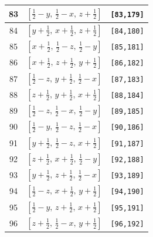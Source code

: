 \documentclass[fleqn,8pt]{jsarticle}
\begin{document}
\begin{longtable}{ccc}
83 & $\left[ \frac{1}{2} - y,\, \frac{1}{2} - x,\, z + \frac{1}{2} \right]$ & {\tt [83,179]} \\ \hline
84 & $\left[ y + \frac{1}{2},\, x + \frac{1}{2},\, z + \frac{1}{2} \right]$ & {\tt [84,180]} \\ \hline
85 & $\left[ x + \frac{1}{2},\, \frac{1}{2} - z,\, \frac{1}{2} - y \right]$ & {\tt [85,181]} \\ \hline
86 & $\left[ x + \frac{1}{2},\, z + \frac{1}{2},\, y + \frac{1}{2} \right]$ & {\tt [86,182]} \\ \hline
87 & $\left[ \frac{1}{2} - z,\, y + \frac{1}{2},\, \frac{1}{2} - x \right]$ & {\tt [87,183]} \\ \hline
88 & $\left[ z + \frac{1}{2},\, y + \frac{1}{2},\, x + \frac{1}{2} \right]$ & {\tt [88,184]} \\ \hline
89 & $\left[ \frac{1}{2} - z,\, \frac{1}{2} - x,\, \frac{1}{2} - y \right]$ & {\tt [89,185]} \\ \hline
90 & $\left[ \frac{1}{2} - y,\, \frac{1}{2} - z,\, \frac{1}{2} - x \right]$ & {\tt [90,186]} \\ \hline
91 & $\left[ y + \frac{1}{2},\, \frac{1}{2} - z,\, x + \frac{1}{2} \right]$ & {\tt [91,187]} \\ \hline
92 & $\left[ z + \frac{1}{2},\, x + \frac{1}{2},\, \frac{1}{2} - y \right]$ & {\tt [92,188]} \\ \hline
93 & $\left[ y + \frac{1}{2},\, z + \frac{1}{2},\, \frac{1}{2} - x \right]$ & {\tt [93,189]} \\ \hline
94 & $\left[ \frac{1}{2} - z,\, x + \frac{1}{2},\, y + \frac{1}{2} \right]$ & {\tt [94,190]} \\ \hline
95 & $\left[ \frac{1}{2} - y,\, z + \frac{1}{2},\, x + \frac{1}{2} \right]$ & {\tt [95,191]} \\ \hline
96 & $\left[ z + \frac{1}{2},\, \frac{1}{2} - x,\, y + \frac{1}{2} \right]$ & {\tt [96,192]} \\
\end{longtable}
\end{document}
